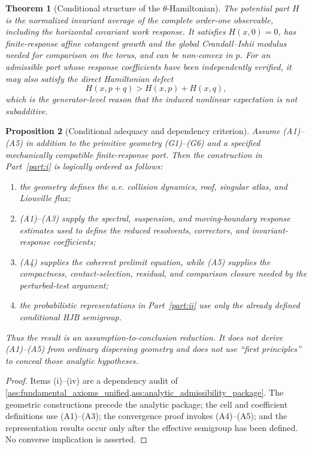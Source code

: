 \documentclass[12pt, letterpaper]{amsart}
\theoremstyle{plain}
\newtheorem{theorem}{Theorem}[section]
\newtheorem{proposition}[theorem]{Proposition}
\theoremstyle{definition}
\theoremstyle{remark}
\begin{document}
\begin{theorem}[Conditional structure of the $\theta$-Hamiltonian]
The potential part $H$ is the normalized invariant average of the complete
order-one observable, including the horizontal covariant work response.  It
satisfies $H(x,0)=0$, has finite-response affine cotangent growth and the global
Crandall--Ishii modulus needed for comparison on the torus, and can be
non-convex in $p$. For an admissible port whose response coefficients have been
independently verified, it may also satisfy the direct
Hamiltonian defect
\begin{equation}
    H(x,p+q)>H(x,p)+H(x,q),
\end{equation}
which is the generator-level reason that the induced nonlinear expectation is
not subadditive.
\end{theorem}

\begin{proposition}[Conditional adequacy and dependency criterion]
\label{prop:first_principles_adequacy_criterion}
Assume \textup{(A1)--(A5)} in addition to the primitive geometry
\textup{(G1)--(G6)} and a specified mechanically compatible finite-response
port. Then the construction in Part~\ref{part:i} is logically ordered as
follows:
\begin{enumerate}[label=\textup{(\roman*)}, wide, labelindent=0pt]
    \item the geometry defines the a.e. collision dynamics, roof, singular
    atlas, and Liouville flux;
    \item \textup{(A1)--(A3)} supply the spectral, suspension, and
    moving-boundary response estimates used to define the reduced resolvents,
    correctors, and invariant-response coefficients;
    \item \textup{(A4)} supplies the coherent prelimit equation, while
    \textup{(A5)} supplies the compactness, contact-selection, residual, and
    comparison closure needed by the perturbed-test argument;
    \item the probabilistic representations in Part~\ref{part:ii} use only the
    already defined conditional HJB semigroup.
\end{enumerate}
Thus the result is an assumption-to-conclusion reduction. It does not derive
\textup{(A1)--(A5)} from ordinary dispersing geometry and does not use
``first principles'' to conceal those analytic hypotheses.
\end{proposition}

\begin{proof}
Items \textup{(i)--(iv)} are a dependency audit of
\cref{ass:fundamental_axioms_unified,ass:analytic_admissibility_package}.
The geometric constructions precede the analytic package; the cell and
coefficient definitions use \textup{(A1)--(A3)}; the convergence proof invokes
\textup{(A4)--(A5)}; and the representation results occur only after the
effective semigroup has been defined. No converse implication is asserted.
\end{proof}
\end{document}
